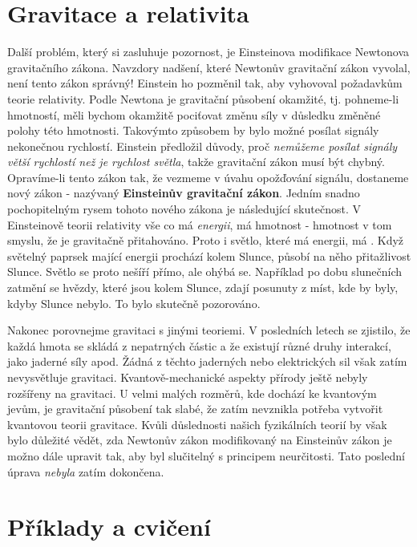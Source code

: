     
    
  \section{Gravitace a relativita}
    Další problém, který si zasluhuje pozornost, je Einsteinova modifikace Newtonova gravitačního 
    zákona. Navzdory nadšení, které Newtonův gravitační zákon vyvolal, není tento zákon správný! 
    Einstein ho pozměnil tak, aby vyhovoval požadavkům teorie relativity. Podle Newtona je 
    gravitační působení okamžité, tj. pohneme-li hmotností, měli bychom okamžitě pociťovat změnu 
    síly v důsledku změněné polohy této hmotnosti. Takovýmto způsobem by bylo možné posílat signály 
    nekonečnou rychlostí. Einstein předložil důvody, proč \emph{nemůžeme posílat signály větší 
    rychlostí než je rychlost světla}, takže gravitační zákon musí být chybný. Opravíme-li tento 
    zákon tak, že vezmeme v úvahu opožďování signálu, dostaneme nový zákon - nazývaný 
    \textbf{Einsteinův gravitační zákon}. Jedním snadno pochopitelným rysem tohoto nového zákona je 
    následující skutečnost. V Einsteinově teorii relativity vše co má \emph{energii}, má hmotnost - 
    hmotnost v tom smyslu, že je gravitačně přitahováno. Proto i světlo, které má energii, má 
    . Když světelný paprsek mající energii prochází kolem Slunce, působí na něho 
    přitažlivost Slunce. Světlo se proto nešíří přímo, ale ohýbá se. Například po dobu slunečních 
    zatmění se hvězdy, které jsou kolem Slunce, zdají posunuty z míst, kde by byly, kdyby Slunce 
    nebylo. To bylo skutečně pozorováno.
    
    Nakonec porovnejme gravitaci s jinými teoriemi. V posledních letech se zjistilo, že každá hmota 
    se skládá z nepatrných částic a že existují různé druhy interakcí, jako jaderné síly apod. 
    Žádná z těchto jaderných nebo elektrických sil však zatím nevysvětluje gravitaci.     
    Kvantově-mechanické aspekty přírody ještě nebyly rozšířeny na gravitaci. U velmi malých 
    rozměrů, kde dochází ke kvantovým jevům, je gravitační působení tak slabé, že zatím nevznikla 
    potřeba vytvořit kvantovou teorii gravitace. Kvůli důslednosti našich fyzikálních teorií by 
    však bylo důležité vědět, zda Newtonův zákon modifikovaný na Einsteinův zákon je možno dále 
    upravit tak, aby byl slučitelný s principem neurčitosti. Tato poslední úprava \emph{nebyla} 
    zatím dokončena.
  
  \section{Příklady a cvičení}

\printbibliography[heading=subbibliography]
